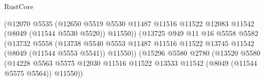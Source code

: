 \begin{lexlean}{RustCore}
\begin{coremodule}
                                              (@12070
                                                @5535
                                                (@12650
                                                  @5519
                                                  @5530
                                                  @11487
                                                  @11516
                                                  @11522
                                                  @12083
                                                  @11542
                                                  (@8049 (@11544 @5530 @5520))
                                                  @11550))
                                              (@13725
                                                @949
                                                @11
                                                @16
                                                @5558
                                                @5582
                                                (@13732
                                                  @5558
                                                  (@13738
                                                    @5540
                                                    @5553
                                                    @11487
                                                    @11516
                                                    @11522
                                                    @13745
                                                    @11542
                                                    (@8049 (@11544 @5553 @5541))
                                                    @11550))
                                                (@15296
                                                  @5580
                                                  @2780
                                                  (@13520
                                                    @5580
                                                    (@14228
                                                      @5563
                                                      @5575
                                                      @12030
                                                      @11516
                                                      @11522
                                                      @13533
                                                      @11542
                                                      (@8049 (@11544 @5575 @5564))
                                                      @11550))

\end{coremodule}
\end{lexlean}
